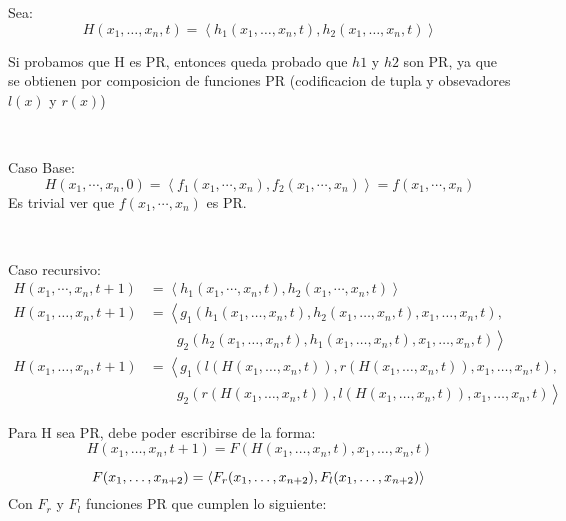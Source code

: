 \documentclass{report}
\begin{document}
\begin{myproof}

	Sea: $$H(x_1,\ldots,x_n,t)=\left\langle h_1(x_1,\ldots,x_n,t),h_2(x_1,\ldots,x_n,t)\right\rangle $$

	Si probamos que H es PR, entonces queda probado que $h1$ y $h2$ son PR, ya que se obtienen por composicion de funciones PR 
	(codificacion de tupla y obsevadores $l(x)$ y $r(x)$)

	~ 

	Caso Base:
	$$H(x_{1},\cdots,x_{n},0)=\left\langle f_{1}(x_{1},\cdots,x_{n}),f_{2}(x_{1},\cdots,x_{n})\right\rangle = f(x_{1},\cdots,x_{n}) $$
	Es trivial ver que $f(x_{1},\cdots,x_{n})$ es PR. 

	~

	Caso recursivo:
	$$\begin{aligned}
		H(x_1,\cdots,x_n,t+1)&=\left\langle h_1(x_1,\cdots,x_n,t),h_2(x_1,\cdots,x_n,t)\right\rangle \\
		H(x_{1},\ldots,x_{n},t+1)&=\left\langle g_{1}\left(h_{1}(x_{1},\ldots,x_{n},t),h_{2}(x_{1},\ldots,x_{n},t),x_{1},\ldots,x_{n},t\right), \right. \\
		&\qquad \left. g_{2}\left(h_{2}(x_{1},\ldots,x_{n},t),h_{1}(x_{1},\ldots,x_{n},t),x_{1},\ldots,x_{n},t\right)\right\rangle \\
		H(x_{1},\ldots,x_{n},t+1)&=\left\langle g_{1}\left(  l(H(x_{1},\ldots,x_{n},t) ), r(H(x_{1},\ldots,x_{n},t)),x_{1},\ldots,x_{n},t\right), \right. \\
		&\qquad \left. g_{2}\left( r(H(x_{1},\ldots,x_{n},t)), l(H(x_{1},\ldots,x_{n},t)),x_{1},\ldots,x_{n},t\right)\right\rangle 
	\end{aligned}$$

	Para H sea PR, debe poder escribirse de la forma:
	$$H(x_1,\ldots,x_n,t+1)=F(H(x_1,\ldots,x_n,t),x_1,\ldots,x_n,t)$$

	\begin{myproof}
		$$F(x_1,\ldots,x_{n+2})=\left\langle F_r(x_1,\ldots,x_{n+2}),F_l(x_1,\ldots,x_{n+2})\right\rangle \\$$
		Con $F_r$ y $F_l$ funciones PR que cumplen lo siguiente:


\end{myproof}
\end{myproof}
\end{document}
